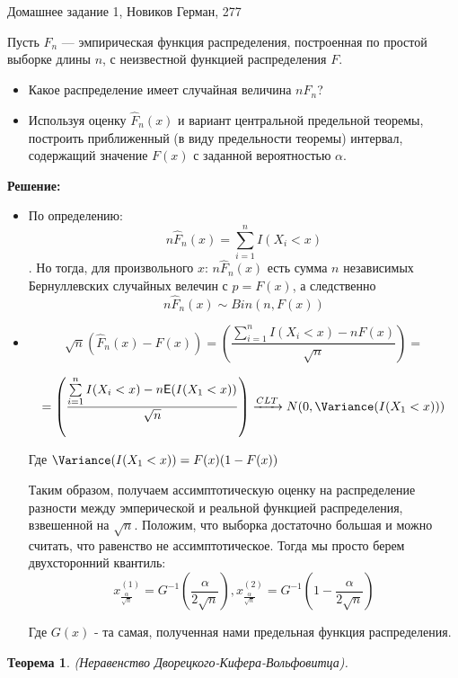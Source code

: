 \documentclass[12pt]{article}
\theoremstyle{definiton}
\newtheorem{Theorem}{Теорема}
\theoremstyle{definition}
\theoremstyle{definition}
\newcommand{\Expect}{\mathsf{E}}
\newcounter{problem}
\newcounter{subproblem}
\def\prp{\medskip\noindent\stepcounter{problem}{\bf Задача \theproblem .  }\setcounter{subproblem}{0} }
\begin{document}
\centerline{\LARGE Домашнее задание 1, Новиков Герман, 277}

\medskip

\prp Пусть $\hat{F}_n$ — эмпирическая функция распределения, построенная по
простой выборке длины $n$, с неизвестной функцией распределения $F$.

\begin{itemize}
\item Какое распределение имеет случайная величина $n \hat{F}_n$?
\item Используя оценку $\hat{F}_n(x)$ и вариант центральной предельной теоремы, построить приближенный (в виду предельности теоремы) интервал, содержащий значение
$F(x)$ с заданной вероятностью $\alpha$.
\end{itemize}

\textbf{Решение: }

\begin{itemize}
\item По определению: $$n \hat{F}_n(x) = \sum\limits_{i=1}^n I(X_i < x)$$. Но тогда, для произвольного $x$: $n \hat{F}_n(x)$ есть сумма $n$ независимых Бернуллевских случайных велечин с $p = F(x)$, а следственно $$n \hat{F}_n(x) \sim Bin(n, F(x))$$


\item 

$$\sqrt{n}(\hat{F}_n(x) - F(x)) = \left(\frac{\sum\limits_{i=1}^n I(X_i < x) - nF(x)}{\sqrt{n}}\right) = $$ 

$$= \left(\frac{\sum\limits_{i=1}^n I(X_i < x) - n\Expect(I(X_1 < x))}{\sqrt{n}}\right) \xrightarrow{CLT} N(0,\Variance(I(X_1 < x)))$$

Где $\Variance(I(X_1 < x)) = F(x)(1 - F(x))$

Таким образом, получаем ассимптотическую оценку на распределение разности между эмперической и реальной функцией распределения, взвешенной на $\sqrt{n}$. Положим, что выборка достаточно большая и можно считать, что равенство не ассимптотическое. Тогда мы просто берем двухсторонний квантиль: $$x^{(1)}_{\frac{\alpha}{\sqrt{n}}} = G^{-1}\left(\frac{\alpha}{2\sqrt{n}}\right), x^{(2)}_{\frac{\alpha}{\sqrt{n}}} = G^{-1}\left(1 -\frac{\alpha}{2\sqrt{n}}\right)$$

Где $G(x)$ - та самая, полученная нами предельная функция распределения.

\end{itemize}


\begin{Theorem}
(Неравенство Дворецкого-Кифера-Вольфовитца).
\end{Theorem}
\end{document}
